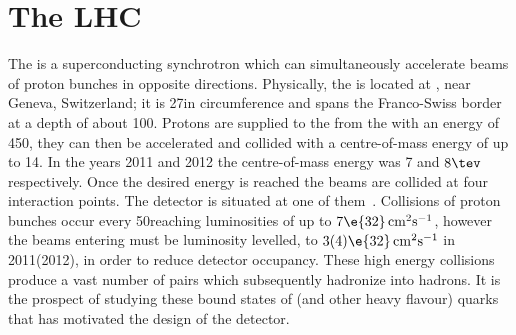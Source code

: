 \section{The LHC}
The \lhc is a superconducting synchrotron which can simultaneously accelerate beams of proton bunches
in opposite directions.
Physically, the \lhc is located at \cern, near Geneva, Switzerland; it is 27\km in
circumference and spans the Franco-Swiss border at a depth of about 100\m.
Protons are supplied to the \lhc from the \sps with an energy of 450\gev, they can then
be accelerated and collided with a centre-of-mass energy of up to 14\tev.
In the years 2011 and 2012 the centre-of-mass energy was 7 and $8\tev$ respectively.
Once the desired energy is reached the beams are collided at four interaction points.
The \lhcb detector is
situated at one of them~\cite{Alves:2008zz}.
Collisions of proton bunches occur every 50\ns reaching luminosities of up to
$7\e{32}\,\mathrm{cm}^{2}\mathrm{s}^{-1}$, however the beams entering \lhcb must be luminosity
levelled, to $3(4)\e{32}\,\mathrm{cm}^{2}\mathrm{s}^{-1}$ in 2011(2012), in order to reduce
detector occupancy.
These high energy collisions produce a vast number of \bbbar pairs which subsequently hadronize
into \bquark hadrons.
It is the prospect of studying these bound states of \bquark (and other heavy
flavour) quarks that has motivated the design of the \lhcb detector.


